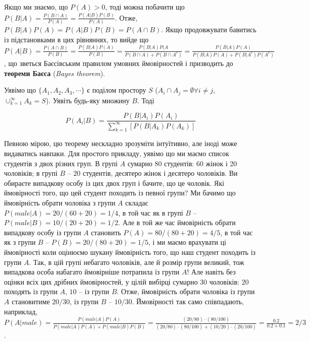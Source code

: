 \documentclass[
  11pt,
]{book}
\begin{document}
Якщо ми знаємо, що \(P(A)>0\), тоді можна побачити що \(P(B|A) = \frac{P(B \cap A)}{P(A)} = \frac{P(A | B)P(B)}{P(A)}\). Отже, \(P(B|A)P(A)=P(A|B)P(B)=P(A \cap B)\). Якщо продовжувати бавитись із підстановками в цих рівняннях, то вийде що \(P(A|B) = \frac{P(A \cap B)}{P(B)} = \frac{P(B|A) P(A)}{P(B)} = \frac{P(B|A)P(A}{P(B \cap A) + P(B \cap A^c)} = \frac{P(B|A)P(A)}{P(B|A) P(A) + P(B|A^c)P(A^c)}\), що зветься Баєсівським правилом умовних ймовірностей і призводить до \textbf{теореми Баєса} (\emph{Bayes theorem}).

Уявімо що \(\{A_1, A_2, A_3, \cdots\}\) є поділом простору \(S\) (\(A_i \cap A_j = \emptyset \forall i \neq j\), \(\cup_{k=1}^{\infty} A_k = S\)). Уявіть будь-яку множину \(B\). Тоді

\[P(A_i|B) = \frac{P(B|A_i)P(A_i)}{\sum_{k=1}^{\infty}[P(B|A_k)P(A_k)]}\]

Певною мірою, цю теорему нескладно зрозуміти інтуїтивно, але іноді може видаватись навпаки. Для простого прикладу, уявімо що ми маємо список студентів з двох різних груп. В групі \(A\) сумарно 80 студентів: 60 жінок і 20 чоловіків; в групі \(B\) -- 20 студентів, десятеро жінок і десятеро чоловіків. Ви обираєте випадкову особу із цих двох груп і бачите, що це чоловік. Які ймовірності того, що цей студент походить із певної групи? Ми бачимо що ймовірність обрати чоловіка з групи \(A\) складає \(P(male|A) =  20/(60+20) = 1/4\), в той час як в групі \(B\) -- \(P(male|B) = 10/(20+20) = 1/2\). Але в той же час ймовірність обрати випадкову особу із групи \(A\) становить \(P(A) = 80/(80+20) = 4/5\), в той час як з групи \(B\) -- \(P(B) = 20/(80+20) = 1/5\), і ми маємо врахувати ці ймовірності коли оцінюємо шукану ймовірність того, що наш студент походить із групи \(A\). Так, в цій групі небагато чоловіків, але й розмір групи великий, тож випадкова особа набагато ймовірніше потрапила із групи \(A\)! Але навіть без оцінки всіх цих дрібних ймовірностей, у цілій вибірці сумарно \(30\) чоловіків: \(20\) походять із групи \(A\), \(10\) -- із групи \(B\). Отже, ймовірність обрати чоловіка із групи \(A\) становитиме \(20/30\), із групи \(B\) -- \(10/30\). Ймовірності так само співпадають, наприклад, \(P(A|male) = \frac{P(male|A)P(A)}{P(male|A)P(A) + P(male|B)P(B)} = \frac{(20/80) \cdot (80/100)}{(20/80) \cdot (80/100) + (10/20) \cdot (20/100)} = \frac{0.2}{0.2+0.1}=2/3\).
\end{document}

